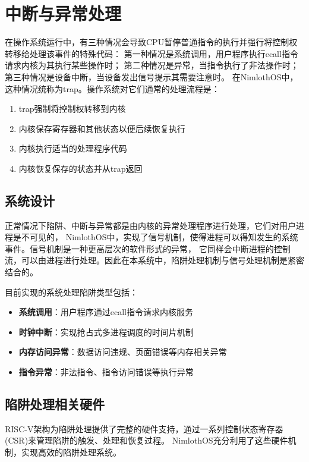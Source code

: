 \chapter{中断与异常处理}

在操作系统运行中，有三种情况会导致CPU暂停普通指令的执行并强行将控制权转移给处理该事件的特殊代码：
第一种情况是系统调用，用户程序执行ecall指令请求内核为其执行某些操作时；
第二种情况是异常，当指令执行了非法操作时；
第三种情况是设备中断，当设备发出信号提示其需要注意时。
在NimlothOS中，这种情况统称为trap。操作系统对它们通常的处理流程是：

\begin{enumerate}
    \item trap强制将控制权转移到内核
    \item 内核保存寄存器和其他状态以便后续恢复执行
    \item 内核执行适当的处理程序代码
    \item 内核恢复保存的状态并从trap返回
\end{enumerate}

\section{系统设计}

正常情况下陷阱、中断与异常都是由内核的异常处理程序进行处理，它们对用户进程是不可见的，
NimlothOS中，实现了信号机制，使得进程可以得知发生的系统事件。信号机制是一种更高层次的软件形式的异常，
它同样会中断进程的控制流，可以由进程进行处理。因此在本系统中，陷阱处理机制与信号处理机制是紧密结合的。

目前实现的系统处理陷阱类型包括：

\begin{itemize}
    \item \textbf{系统调用}：用户程序通过ecall指令请求内核服务
    \item \textbf{时钟中断}：实现抢占式多进程调度的时间片机制
    \item \textbf{内存访问异常}：数据访问违规、页面错误等内存相关异常
    \item \textbf{指令异常}：非法指令、指令访问错误等执行异常
\end{itemize}

\section{陷阱处理相关硬件}

RISC-V架构为陷阱处理提供了完整的硬件支持，通过一系列控制状态寄存器(CSR)来管理陷阱的触发、处理和恢复过程。
NimlothOS充分利用了这些硬件机制，实现高效的陷阱处理系统。

